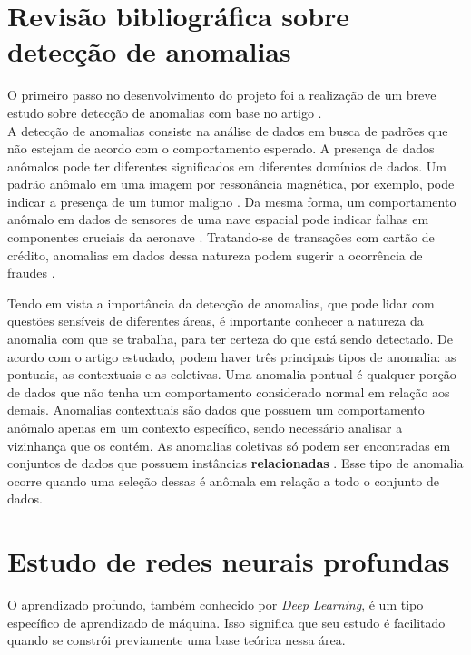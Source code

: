\documentclass[a4paper,12pt]{article}
\begin{document}
\section{Revisão bibliográfica sobre detecção de anomalias}

O primeiro passo no desenvolvimento do projeto foi a realização de um breve estudo sobre detecção de anomalias com base no artigo \cite{Chandola:2009}.\\

A detecção de anomalias consiste na análise de dados em busca de padrões que não estejam de acordo com o comportamento esperado. A presença de dados anômalos pode ter diferentes significados em diferentes domínios de dados. Um padrão anômalo em uma imagem por ressonância magnética, por exemplo, pode indicar a presença de um tumor maligno \cite{spence2001}. Da mesma forma, um comportamento anômalo em dados de sensores de uma nave espacial pode indicar falhas em componentes cruciais da aeronave \cite{fujimaki2005}. Tratando-se de transações com cartão de crédito, anomalias em dados dessa natureza podem sugerir a ocorrência de fraudes \cite{aleskerov1997}.

Tendo em vista a importância da detecção de anomalias, que pode lidar com questões sensíveis de diferentes áreas, é importante conhecer a natureza da anomalia com que se trabalha, para ter certeza do que está sendo detectado.
De acordo com o artigo estudado, podem haver três principais tipos de anomalia: as pontuais, as contextuais e as coletivas.
Uma anomalia pontual é qualquer porção de dados que não tenha um comportamento considerado normal em relação aos demais. Anomalias contextuais são dados que possuem um comportamento anômalo apenas em um contexto específico, sendo necessário analisar a vizinhança que os contém. As anomalias coletivas só podem ser encontradas em conjuntos de dados que possuem instâncias \textbf{relacionadas} \cite{Chandola:2009}. Esse tipo de anomalia ocorre quando uma seleção dessas é anômala em relação a todo o conjunto de dados.\\




\section{Estudo de redes neurais profundas}

O aprendizado profundo, também conhecido por \textit{Deep Learning}, é um tipo específico de aprendizado de máquina. Isso significa que seu estudo é facilitado quando se constrói previamente uma base teórica nessa área.
\end{document}
